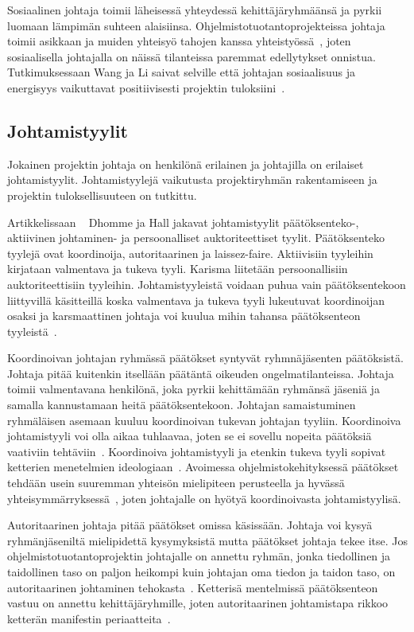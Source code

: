 \documentclass[finnish]{tktltiki2}
\theoremstyle{definition}
\theoremstyle{remark}
\begin{document}
Sosiaalinen johtaja toimii läheisessä yhteydessä kehittäjäryhmäänsä ja pyrkii luomaan lämpimän suhteen alaisiinsa. Ohjelmistotuotantoprojekteissa johtaja toimii asikkaan ja muiden yhteisyö tahojen kanssa yhteistyössä~\cite{McLeod:2011:FAS:1978802.1978803}, joten sosiaalisella johtajalla on näissä tilanteissa paremmat edellytykset onnistua. Tutkimuksessaan Wang ja Li saivat selville että johtajan sosiaalisuus ja energisyys vaikuttavat positiivisesti  projektin tuloksiini~\cite{Wang:2009:PMP:1639950.1640049}. 

\subsection{Johtamistyylit}

Jokainen projektin johtaja on henkilönä erilainen ja johtajilla on erilaiset johtamistyylit. Johtamistyylejä vaikutusta projektiryhmän rakentamiseen ja projektin tuloksellisuuteen on tutkittu. 

Artikkelissaan ~\cite{Dhomne:2012:ITL:2382887.2382899} Dhomme ja Hall jakavat johtamistyylit päätöksenteko-, aktiivinen johtaminen- ja persoonalliset auktoriteettiset tyylit. Päätöksenteko tyylejä ovat koordinoija, autoritaarinen ja laissez-faire. Aktiivisiin tyyleihin kirjataan valmentava ja tukeva tyyli. Karisma liitetään persoonallisiin auktoriteettisiin tyyleihin. Johtamistyyleistä voidaan puhua vain päätöksentekoon liittyvillä käsitteillä koska valmentava ja tukeva tyyli lukeutuvat koordinoijan osaksi ja karsmaattinen johtaja voi kuulua mihin tahansa päätöksenteon tyyleistä~\cite{Dhomne:2012:ITL:2382887.2382899}. 

Koordinoivan johtajan ryhmässä päätökset syntyvät ryhmnäjäsenten päätöksistä. Johtaja pitää kuitenkin itsellään päätäntä oikeuden ongelmatilanteissa. Johtaja toimii valmentavana henkilönä, joka pyrkii kehittämään ryhmänsä jäseniä ja samalla kannustamaan heitä päätöksentekoon. Johtajan samaistuminen ryhmäläisen asemaan kuuluu koordinoivan tukevan johtajan tyyliin. Koordinoiva johtamistyyli voi olla aikaa tuhlaavaa, joten se ei sovellu nopeita päätöksiä vaativiin tehtäviin~\cite{Dhomne:2012:ITL:2382887.2382899}. Koordinoiva johtamistyyli ja etenkin tukeva tyyli sopivat ketterien menetelmien ideologiaan~\cite{fowler2001agile}. Avoimessa ohjelmistokehityksessä päätökset tehdään usein suuremman yhteisön mielipiteen perusteella ja hyvässä yhteisymmärryksessä~\cite{1385637}, joten johtajalle on hyötyä koordinoivasta johtamistyylisä.

Autoritaarinen johtaja pitää päätökset omissa käsissään. Johtaja voi kysyä ryhmänjäseniltä mielipidettä kysymyksistä mutta päätökset johtaja tekee itse. Jos ohjelmistotuotantoprojektin johtajalle on annettu ryhmän, jonka tiedollinen ja taidollinen taso on paljon heikompi kuin johtajan oma tiedon ja taidon taso, on autoritaarinen johtaminen tehokasta~\cite{Dhomne:2012:ITL:2382887.2382899}. Ketterisä mentelmissä päätöksenteon vastuu on annettu kehittäjäryhmille, joten autoritaarinen johtamistapa rikkoo ketterän manifestin periaatteita~\cite{fowler2001agile}.
\end{document}

